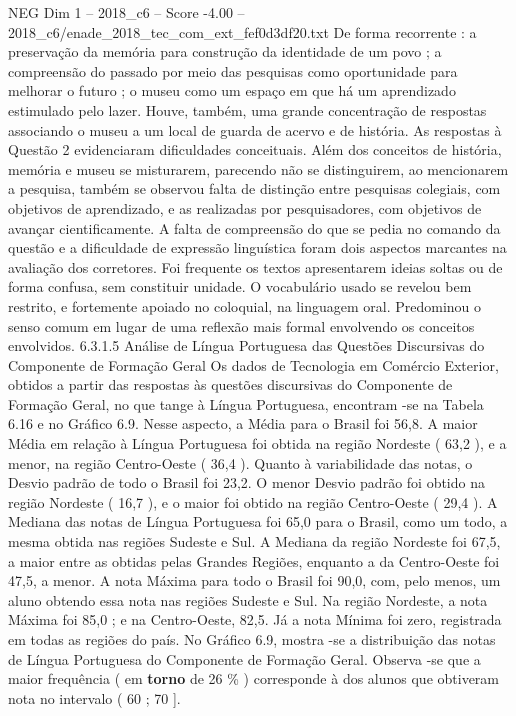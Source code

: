 \begin{textsample}{NEG Dim 1 – 2018\_c6 – Score -4.00 – 2018\_c6/enade\_2018\_tec\_com\_ext\_fef0d3df20.txt}
De forma recorrente : a preservação da memória para construção da identidade de um povo ; a compreensão do passado por meio das pesquisas como oportunidade para melhorar o futuro ; o museu como um espaço em que há um aprendizado estimulado pelo lazer.
Houve, também, uma grande concentração de respostas associando o museu a um local de guarda de acervo e de história.
As respostas à Questão 2 evidenciaram dificuldades conceituais.
Além dos conceitos de história, memória e museu se misturarem, parecendo não se distinguirem, ao mencionarem a pesquisa, também se observou falta de distinção entre pesquisas colegiais, com objetivos de aprendizado, e as realizadas por pesquisadores, com objetivos de avançar cientificamente.
A falta de compreensão do que se pedia no comando da questão e a dificuldade de expressão linguística foram dois aspectos marcantes na avaliação dos corretores.
Foi frequente os textos apresentarem ideias soltas ou de forma confusa, sem constituir unidade.
O vocabulário usado se revelou bem restrito, e fortemente apoiado no coloquial, na linguagem oral.
Predominou o senso comum em lugar de uma reflexão mais formal envolvendo os conceitos envolvidos. 6.3.1.5 Análise de Língua Portuguesa das Questões Discursivas do Componente de Formação Geral Os dados de Tecnologia em Comércio Exterior, obtidos a partir das respostas às questões discursivas do Componente de Formação Geral, no que tange à Língua Portuguesa, encontram -se na Tabela 6.16 e no Gráfico 6.9.
Nesse aspecto, a Média para o Brasil foi 56,8.
A maior Média em relação à Língua Portuguesa foi obtida na região Nordeste ( 63,2 ), e a menor, na região Centro-Oeste ( 36,4 ).
Quanto à variabilidade das notas, o Desvio padrão de todo o Brasil foi 23,2.
O menor Desvio padrão foi obtido na região Nordeste ( 16,7 ), e o maior foi obtido na região Centro-Oeste ( 29,4 ).
A Mediana das notas de Língua Portuguesa foi 65,0 para o Brasil, como um todo, a mesma obtida nas regiões Sudeste e Sul.
A Mediana da região Nordeste foi 67,5, a maior entre as obtidas pelas Grandes Regiões, enquanto a da Centro-Oeste foi 47,5, a menor.
A nota Máxima para todo o Brasil foi 90,0, com, pelo menos, um aluno obtendo essa nota nas regiões Sudeste e Sul.
Na região Nordeste, a nota Máxima foi 85,0 ; e na Centro-Oeste, 82,5.
Já a nota Mínima foi zero, registrada em todas as regiões do país.
No Gráfico 6.9, mostra -se a distribuição das notas de Língua Portuguesa do Componente de Formação Geral.
Observa -se que a maior frequência ( em \textbf{torno} de 26 \% ) corresponde à dos alunos que obtiveram nota no intervalo ( 60 ; 70 ].

\end{textsample}
